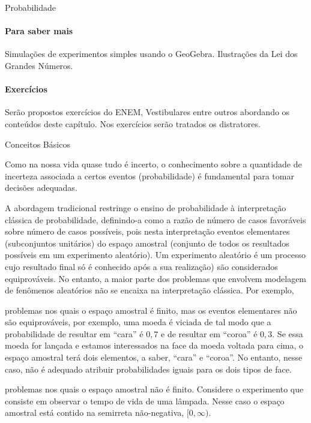 \begin{apresentacao}{Probabilidade}
\paragraph{Para saber mais}
Simulações de experimentos simples usando o GeoGebra. Ilustrações da Lei dos Grandes Números.

\paragraph{Exercícios}
Serão propostos exercícios do ENEM, Vestibulares entre outros abordando os conteúdos deste capítulo. Nos exercícios serão tratados os distratores.

\end{apresentacao}

\def\currentcolor{session1}
\begin{paginatexto}{Conceitos Básicos}{

  Como na nossa vida quase tudo é incerto, o conhecimento sobre a quantidade de incerteza associada a certos eventos (probabilidade) é fundamental para tomar decisões adequadas.

  A abordagem tradicional restringe o ensino de probabilidade à interpretação clássica de probabilidade, definindo-a como a razão de número de casos favoráveis sobre número de casos possíveis, pois nesta interpretação eventos elementares (subconjuntos unitários) do espaço amostral (conjunto de todos os resultados possíveis em um experimento aleatório). Um experimento aleatório é um processo cujo resultado final só é conhecido após a sua realização) são considerados equiprováveis. No entanto, a maior parte dos problemas que envolvem modelagem de fenômenos aleatórios não se encaixa na interpretação clássica. Por exemplo,

  problemas nos quais o espaço amostral é finito, mas os eventos elementares não são equiprováveis, por exemplo, uma moeda é viciada de tal modo que a probabilidade de resultar em “cara”{} é $0{,}7$ e de resultar em “coroa”{} é $0{,}3$. Se essa moeda for lançada e estamos interessados na face da moeda voltada para cima, o espaço amostral terá dois elementos, a saber, “cara”{} e “coroa”. No entanto, nesse caso, não é adequado atribuir probabilidades iguais para os dois tipos de face.

  problemas nos quais o espaço amostral não é finito. Considere o experimento que consiste em observar o tempo de vida de uma lâmpada. Nesse caso o espaço amostral está contido na semirreta não-negativa, $[0,\infty)$.

}
\end{paginatexto}
